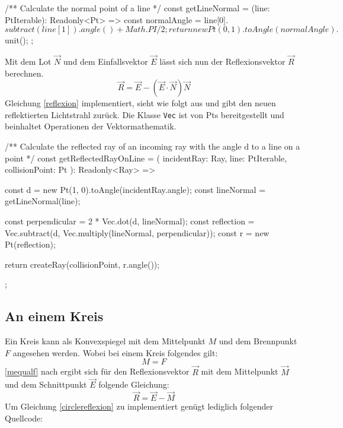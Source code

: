\begin{verbnobox}[\scriptsize\mbox{}]
/** Calculate the normal point of a line */
const getLineNormal = (line: PtIterable): Readonly<Pt> => {
    const normalAngle = line[0].$subtract(line[1]).angle() + Math.PI / 2;
    return new Pt(0, 1).toAngle(normalAngle).$unit();
};
\end{verbnobox}
Mit dem Lot $ \vec{N} $ und dem Einfallsvektor $ \vec{E} $ lässt sich nun der Reflexionsvektor $ \vec{R} $ berechnen. \parencite[vgl.][Kapitel 10]{cross2013raytracing}
\begin{equation}
    \label{reflexion}
    \vec{R} = \vec{E} - (\vec{E} \cdot \vec{N})\vec{N}
\end{equation}
Gleichung \ref{reflexion} implementiert, sieht wie folgt aus und gibt den neuen reflektierten Lichtstrahl zurück. 
Die Klasse \texttt{Vec} ist von Pts bereitgestellt und beinhaltet Operationen der Vektormathematik.

\begin{verbnobox}[\scriptsize\mbox{}]
/** Calculate the reflected ray of an incoming ray with the angle d to a line on a point */
const getReflectedRayOnLine = (
    incidentRay: Ray,
    line: PtIterable,
    collisionPoint: Pt
): Readonly<Ray> => {
    const d = new Pt(1, 0).toAngle(incidentRay.angle);
    const lineNormal = getLineNormal(line);

    const perpendicular = 2 * Vec.dot(d, lineNormal);
    const reflection = Vec.subtract(d, Vec.multiply(lineNormal, perpendicular));
    const r = new Pt(reflection);

    return createRay(collisionPoint, r.angle());
};
\end{verbnobox}

\subsection*{An einem Kreis}
Ein Kreis kann als Konvexspiegel mit dem Mittelpunkt $ M $ und dem Brennpunkt $ F $ angesehen werden. \parencite[vgl.][S. 362]{kuchling2004taschenbuch}
Wobei bei einem Kreis folgendes gilt: 
\begin{equation}
    \label{mequalf}
    M = F
\end{equation}
\ref{mequalf} nach ergibt sich für den Reflexionsvektor $ \vec{R} $ mit dem Mittelpunkt $ \vec{M} $ und dem Schnittpunkt $ \vec{E} $ folgende Gleichung:
\begin{equation}
    \label{circlereflexion}
    \vec{R} = \vec{E} - \vec{M}
\end{equation}
Um Gleichung \ref{circlereflexion} zu implementiert genügt lediglich folgender Quellcode:

